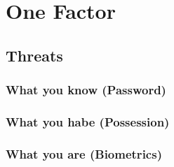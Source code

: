 \chapter{One Factor}

\section{Threats}

\subsection{What you know (Password)}

\subsection{What you habe (Possession)}

\subsection{What you are (Biometrics)}
